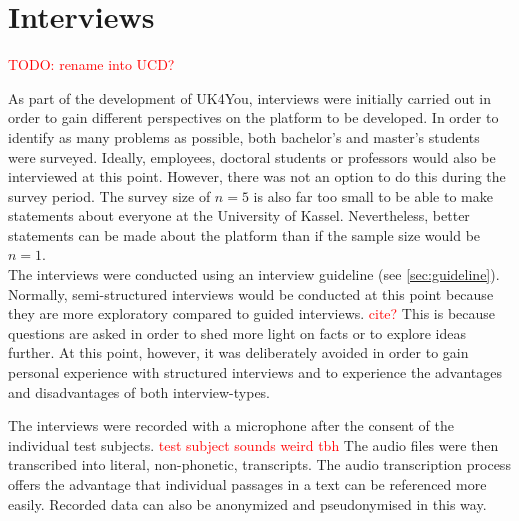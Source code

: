\section{Interviews}
\textcolor{red}{TODO: rename into UCD?}

As part of the development of UK4You, interviews were initially carried out in order to gain different perspectives on the platform to be developed.
In order to identify as many problems as possible, both bachelor's and master's students were surveyed.
Ideally, employees, doctoral students or professors would also be interviewed at this point.
However, there was not an option to do this during the survey period.
The survey size of $n=5$ is also far too small to be able to make statements about everyone at the University of Kassel.
Nevertheless, better statements can be made about the platform than if the sample size would be $n=1$.\\

The interviews were conducted using an interview guideline (see \autoref{sec:guideline}).
Normally, semi-structured interviews would be conducted at this point because they are more exploratory compared to guided interviews. \textcolor{red}{cite?}
This is because questions are asked in order to shed more light on facts or to explore ideas further.
At this point, however, it was deliberately avoided in order to gain personal experience with structured interviews and to experience the advantages and disadvantages of both interview-types.

The interviews were recorded with a microphone after the consent of the individual test subjects. \textcolor{red}{test subject sounds weird tbh}
The audio files were then transcribed into literal, non-phonetic, transcripts.
The audio transcription process offers the advantage that individual passages in a text can be referenced more easily.
Recorded data can also be anonymized and pseudonymised in this way.
